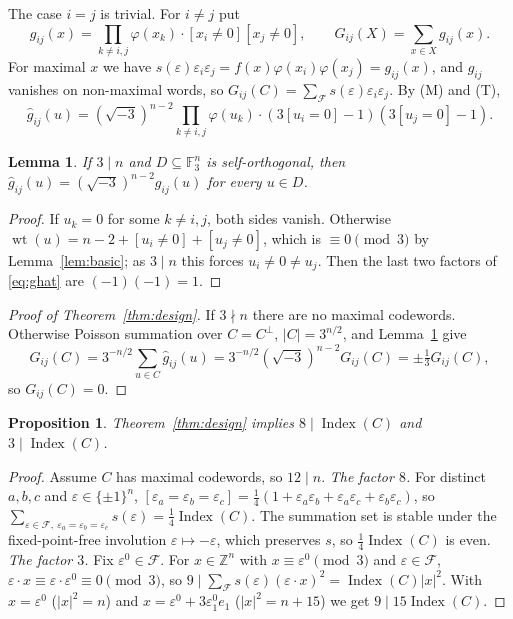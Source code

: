 \documentclass[11pt]{amsart}
\newtheorem{lemma}[theorem]{Lemma}
\newtheorem{proposition}[theorem]{Proposition}
\theoremstyle{definition}
\newcommand{\F}{\mathbb{F}_3}
\newcommand{\Z}{\mathbb{Z}}
\newcommand{\wt}{\operatorname{wt}}
\newcommand{\Index}{\operatorname{Index}}
\newcommand{\cF}{\mathcal{F}}
\newcommand{\isq}{\sqrt{-3}}
\begin{document}
The case $i=j$ is trivial. For $i\ne j$ put
\[
  g_{ij}(x)=\prod_{k\ne i,j}\varphi(x_k)\cdot[x_i\ne0][x_j\ne0],\qquad
  G_{ij}(X)=\sum_{x\in X}g_{ij}(x).
\]
For maximal $x$ we have $s(\varepsilon)\varepsilon_i\varepsilon_j=f(x)\varphi(x_i)\varphi(x_j)
=g_{ij}(x)$, and $g_{ij}$ vanishes on non-maximal words, so
$G_{ij}(C)=\sum_{\cF}s(\varepsilon)\varepsilon_i\varepsilon_j$. By (M) and (T),
\begin{equation}\label{eq:ghat}
  \hat g_{ij}(u)=(\isq)^{n-2}\prod_{k\ne i,j}\varphi(u_k)\cdot(3[u_i=0]-1)(3[u_j=0]-1).
\end{equation}

\begin{lemma}\label{lem:pointwise}
If $3\mid n$ and $D\subseteq\F^n$ is self-orthogonal, then $\hat g_{ij}(u)=(\isq)^{n-2}g_{ij}(u)$
for every $u\in D$.
\end{lemma}

\begin{proof}
If $u_k=0$ for some $k\ne i,j$, both sides vanish. Otherwise
$\wt(u)=n-2+[u_i\ne0]+[u_j\ne0]$, which is $\equiv0\pmod3$ by Lemma~\ref{lem:basic}; as $3\mid n$
this forces $u_i\ne0\ne u_j$. Then the last two factors of \eqref{eq:ghat} are $(-1)(-1)=1$.
\end{proof}

\begin{proof}[Proof of Theorem~\ref{thm:design}]
If $3\nmid n$ there are no maximal codewords. Otherwise Poisson summation over $C=C^\perp$,
$|C|=3^{n/2}$, and Lemma~\ref{lem:pointwise} give
\[
  G_{ij}(C)=3^{-n/2}\sum_{u\in C}\hat g_{ij}(u)=3^{-n/2}(\isq)^{n-2}G_{ij}(C)=\pm\tfrac13G_{ij}(C),
\]
so $G_{ij}(C)=0$.
\end{proof}

\begin{proposition}\label{prop:design-suffices}
Theorem~\ref{thm:design} implies $8\mid\Index(C)$ and $3\mid\Index(C)$.
\end{proposition}

\begin{proof}
Assume $C$ has maximal codewords, so $12\mid n$.
\emph{The factor $8$.} For distinct $a,b,c$ and $\varepsilon\in\{\pm1\}^n$,
$[\varepsilon_a=\varepsilon_b=\varepsilon_c]=\frac14(1+\varepsilon_a\varepsilon_b
+\varepsilon_a\varepsilon_c+\varepsilon_b\varepsilon_c)$, so
$\sum_{\varepsilon\in\cF,\ \varepsilon_a=\varepsilon_b=\varepsilon_c}s(\varepsilon)
=\frac14\Index(C)$. The summation set is stable under the fixed-point-free involution
$\varepsilon\mapsto-\varepsilon$, which preserves $s$, so $\frac14\Index(C)$ is even.
\emph{The factor $3$.} Fix $\varepsilon^0\in\cF$. For $x\in\Z^n$ with $x\equiv\varepsilon^0\pmod3$
and $\varepsilon\in\cF$, $\varepsilon\cdot x\equiv\varepsilon\cdot\varepsilon^0\equiv0\pmod3$, so
$9\mid\sum_\cF s(\varepsilon)(\varepsilon\cdot x)^2=\Index(C)|x|^2$. With $x=\varepsilon^0$
($|x|^2=n$) and $x=\varepsilon^0+3\varepsilon^0_1e_1$ ($|x|^2=n+15$) we get $9\mid15\Index(C)$.
\end{proof}
\end{document}
